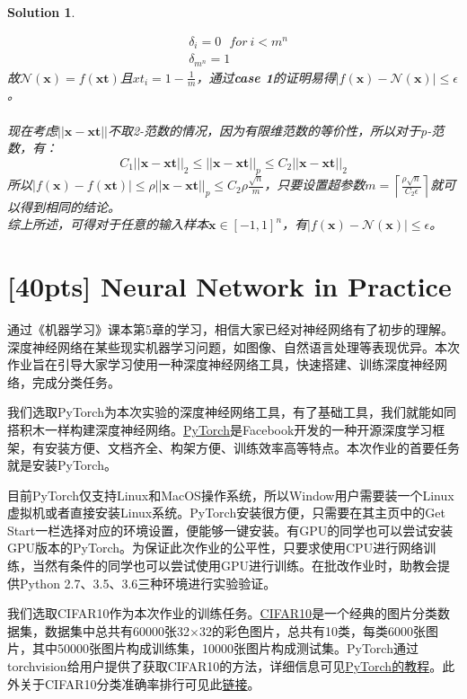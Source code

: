 \documentclass[a4paper,UTF8]{article}
\numberwithin{equation}{section}
\newtheorem*{solution}{Solution}
\begin{document}
\begin{solution}
\begin{enumerate}[ {(}1{)}]
\begin{equation}
\begin{aligned}
&\delta_i = 0\ \ \ for\ i < m^n\\
&\delta_{m^n} = 1
\end{aligned}
\end{equation}
故$\mathcal{N}(\mathbf{x}) = f(\mathbf{xt})$且$xt_i = 1 - \frac{1}{m}$，通过\textbf{case 1}的证明易得$|f(\mathbf{x}) - \mathcal{N}(\mathbf{x})| \leq \epsilon$。\\\\
现在考虑$||\mathbf{x}-\mathbf{xt}||$不取2-范数的情况，因为有限维范数的等价性，所以对于p-范数，有：
\begin{equation}
C_1||\mathbf{x}-\mathbf{xt}||_2 \leq ||\mathbf{x}-\mathbf{xt}||_p \leq C_2||\mathbf{x}-\mathbf{xt}||_2
\end{equation}
所以$|f(\mathbf{x}) - f(\mathbf{xt})| \leq \rho||\mathbf{x} - \mathbf{xt}||_p  \leq C_2\rho\frac{\sqrt{n}}{m}$，只要设置超参数$m=\left\lceil\frac{\rho\sqrt{n}}{C_2\epsilon}\right\rceil$就可以得到相同的结论。\\
综上所述，可得对于任意的输入样本$ \mathbf{x} \in [-1,1]^n $，有$|f(\mathbf{x}) - \mathcal{N}(\mathbf{x})| \leq \epsilon$。
\end{enumerate}


\end{solution}
\newpage

\section{[40pts] Neural Network in Practice}
通过《机器学习》课本第5章的学习，相信大家已经对神经网络有了初步的理解。深度神经网络在某些现实机器学习问题，如图像、自然语言处理等表现优异。本次作业旨在引导大家学习使用一种深度神经网络工具，快速搭建、训练深度神经网络，完成分类任务。

我们选取PyTorch为本次实验的深度神经网络工具，有了基础工具，我们就能如同搭积木一样构建深度神经网络。\href{http://pytorch.org/}{PyTorch}是Facebook开发的一种开源深度学习框架，有安装方便、文档齐全、构架方便、训练效率高等特点。本次作业的首要任务就是安装PyTorch。

目前PyTorch仅支持Linux和MacOS操作系统，所以Window用户需要装一个Linux虚拟机或者直接安装Linux系统。PyTorch安装很方便，只需要在其主页中的Get Start一栏选择对应的环境设置，便能够一键安装。有GPU的同学也可以尝试安装GPU版本的PyTorch。为保证此次作业的公平性，只要求使用CPU进行网络训练，当然有条件的同学也可以尝试使用GPU进行训练。在批改作业时，助教会提供Python 2.7、3.5、3.6三种环境进行实验验证。

我们选取CIFAR10作为本次作业的训练任务。\href{https://en.wikipedia.org/wiki/CIFAR-10}{CIFAR10}是一个经典的图片分类数据集，数据集中总共有60000张32$\times$32的彩色图片，总共有10类，每类6000张图片，其中50000张图片构成训练集，10000张图片构成测试集。PyTorch通过torchvision给用户提供了获取CIFAR10的方法，详细信息可见\href{http://pytorch.org/tutorials/beginner/blitz/cifar10_tutorial.html}{PyTorch的教程}。此外关于CIFAR10分类准确率排行可见此\href{http://rodrigob.github.io/are_we_there_yet/build/classification_datasets_results.html}{链接}。
\end{document}
